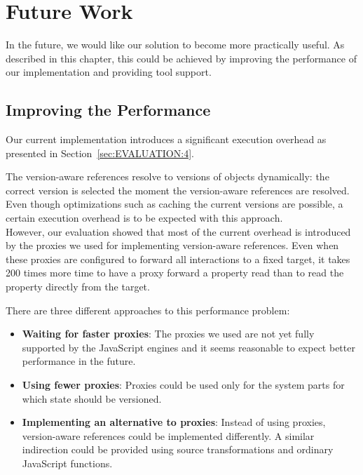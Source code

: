 \chapter{Future Work} \label{chapter:FUTURE_WORK}

In the future, we would like our solution to become more practically useful.
As described in this chapter, this could be achieved by improving the performance of our implementation and providing tool support.


\section{Improving the Performance} \label{sec:FUTURE_WORK:1}

Our current implementation introduces a significant execution overhead as presented in Section~\ref{sec:EVALUATION:4}.

The version-aware references resolve to versions of objects dynamically: the correct version is selected the moment the version-aware references are resolved.
Even though optimizations such as caching the current versions are possible, a certain execution overhead is to be expected with this approach.\\
However, our evaluation showed that most of the current overhead is introduced by the proxies we used for implementing version-aware references.
Even when these proxies are configured to forward all interactions to a fixed target, it takes 200 times more time to have a proxy forward a property read than to read the property directly from the target.

There are three different approaches to this performance problem:

\begin{itemize}
    \item \textbf{Waiting for faster proxies}: The proxies we used are not yet fully supported by the JavaScript engines and it seems reasonable to expect better performance in the future.
    \item \textbf{Using fewer proxies}: Proxies could be used only for the system parts for which state should be versioned.
    \item \textbf{Implementing an alternative to proxies}: Instead of using proxies, version-aware references could be implemented differently. A similar indirection could be provided using source transformations and ordinary JavaScript functions.
\end{itemize}


